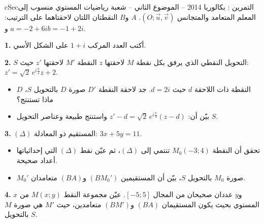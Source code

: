 \documentclass[12pt,a4paper]{article}
\newenvironment{BOX}[2]{\begin{otherlanguage}{english}\begin{arbox}{#1}{#2}}{\end{arbox}\end{otherlanguage}}
\newcounter{exo}
\newenvironment{tamrin}[1]{\stepcounter{exo}\begin{BOX}{cSec}{التمرين \theexo: #1}}{\end{BOX}}
\newenvironment{sq}{\begin{itemize}[leftmargin=2.4em,itemsep=3pt]}{\end{itemize}}
\newcommand{\qa}{\item[(أ)]}\newcommand{\qb}{\item[(ب)]}\newcommand{\qc}{\item[(جـ)]}\newcommand{\qd}{\item[(د)]}\newcommand{\qe}{\item[(هـ)]}
\newcommand{\QQ}[1]{\par\smallskip\textbf{#1.} }
\begin{document}
\begin{tamrin}{بكالوريا 2014 -- الموضوع الثاني -- شعبة رياضيات}
المستوي منسوب إلى المعلم المتعامد والمتجانس $(O;\vec u,\vec v)$. $A$ و$B$ النقطتان اللتان لاحقتاهما على الترتيب: $a=-2+6i$ و$b=-1+2i$.
\QQ{1} أكتب العدد المركب $1+i$ على الشكل الأسي.
\QQ{2} $S$ التحويل النقطي الذي يرفق بكل نقطة $M$ لاحقتها $z$ النقطة $M'$ لاحقتها $z'$ حيث: $z'=\sqrt2\,e^{i\frac{\pi}{4}}z+2$.
\begin{sq}
\qa $D$ النقطة ذات اللاحقة $d$ حيث $d=2i$. جد لاحقة النقطة $D'$ صورة $D$ بالتحويل $S$، ماذا تستنتج؟
\qb بيّن أن: $z'-d=\sqrt2\,e^{i\frac{\pi}{4}}(z-d)$ واستنتج طبيعة وعناصر التحويل $S$.
\end{sq}
\QQ{3} $(\Delta)$ المستقيم ذو المعادلة: $3x+5y=11$.
\begin{sq}
\qa تحقق أن النقطة $M_0(-3;4)$ تنتمي إلى $(\Delta)$، ثم عيّن نقط $(\Delta)$ التي إحداثياتها أعداد صحيحة.
\qb $M_0'$ صورة $M_0$ بالتحويل $S$، بيّن أن المستقيمين $(BM_0')$ و$(BA)$ متعامدان.
\end{sq}
\QQ{4} $x$ و$y$ عددان صحيحان من المجال $[-5;5]$. عيّن مجموعة النقط $M(x;y)$ من المستوي بحيث يكون المستقيمان $(BA)$ و$(BM')$ متعامدين، حيث $M'$ هي صورة $M$ بالتحويل $S$.
\end{tamrin}
\end{document}
